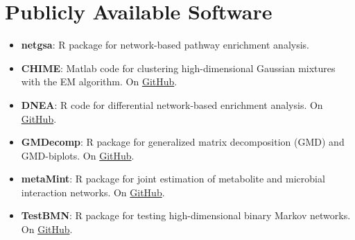 \documentclass[10pt]{article}
\begin{document}
\section*{Publicly Available Software}
\begin{itemize}
\item {\bf netgsa}: R package for network-based pathway enrichment analysis. 
\item {\bf CHIME}: Matlab code for clustering high-dimensional Gaussian mixtures with the EM algorithm. On \href{https://github.com/drjingma/gmm}{GitHub}.
\item \textbf{DNEA}: R code for differential network-based enrichment analysis. On \href{https://github.com/wiggie/DNEA}{GitHub}.
\item {\bf GMDecomp}: R package for generalized matrix decomposition (GMD) and GMD-biplots. On \href{https://github.com/taryue/GMDecomp}{GitHub}.
\item \textbf{metaMint}: R package for joint estimation of metabolite and microbial interaction networks. On \href{https://github.com/drjingma/metaMint}{GitHub}.
\item {\bf TestBMN}: R package for testing high-dimensional binary Markov networks. On \href{https://github.com/drjingma/TestBMN}{GitHub}.
\end{itemize}





\end{document}
